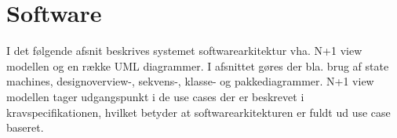 \chapter{Software}

I det følgende afsnit beskrives systemet softwarearkitektur vha. N+1 view modellen og en række UML diagrammer. I afsnittet gøres der bla. brug af state machines, designoverview-, sekvens-, klasse- og pakkediagrammer. N+1 view modellen tager udgangspunkt i de use cases der er beskrevet i kravspecifikationen, hvilket betyder at softwarearkitekturen er fuldt ud use case baseret.



\newpage


\newpage


\newpage


\newpage



\newpage



